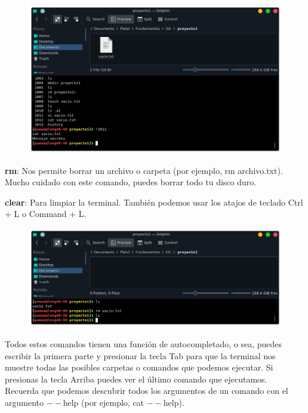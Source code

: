 \documentclass{article}
\begin{document}
\begin{figure}[h!]
  \centering
  \includegraphics[scale=0.7]{./Pictures/065_history_admiracion.png}
\end{figure}

\newpage

\textbf{rm}: Nos permite borrar un archivo o carpeta (por ejemplo, rm
archivo.txt). Mucho cuidado con este comando, puedes borrar todo tu disco
duro.

\textbf{clear}: Para limpiar la terminal. También podemos usar los atajos de
teclado Ctrl + L o Command + L.

\begin{figure}[h!]
  \centering
  \includegraphics[scale=0.7]{./Pictures/066_rm.png}
\end{figure}

Todos estos comandos tienen una función de autocompletado, o sea, puedes
escribir la primera parte y presionar la tecla Tab para que la terminal nos
muestre todas las posibles carpetas o comandos que podemos ejecutar. Si
presionas la tecla Arriba puedes ver el último comando que ejecutamos.\\

Recuerda que podemos descubrir todos los argumentos de un comando con el
argumento $--$help (por ejemplo, cat $--$help).
\end{document}
